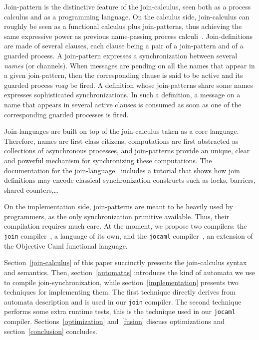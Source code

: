 Join-pattern is the distinctive feature of the join-calculus, seen
both as a process calculus and as a programming language.  On the
calculus side, join-calculus can roughly be seen as a functional
calculus plus join-patterns, thus achieving the same expressive power
as previous name-passing process calculi~\cite{Milner-pi-calculus}.
Join-definitions are made of several clauses, each clause being a pair
of a join-pattern and of a guarded process.  A join-pattern expresses
a synchronization between several {\em names} (or channels). When
messages are pending on all the names that appear in a given
join-pattern, then the corresponding clause is said to be active and
its guarded process {\em may} be fired.  A definition whose
join-patterns share some names expresses sophisticated
synchronizations. In such a definition, a message on a name that
appears in several active clauses is consumed as soon as one of the
corresponding guarded processes is fired.

Join-languages are built on top of the join-calculus taken as a core
language.  Therefore, names are first-class citizens, computations are
first abstracted as collections of asynchronous processes, and
join-patterns provide an unique, clear and powerful mechanism for
synchronizing these computations.  The documentation for the
join-language~\cite{Join} includes a tutorial that shows how join
definitions may encode classical synchronization constructs such as
locks, barriers, shared counters,\ldots

On the implementation side, join-patterns are meant to be heavily used
by programmers, as the only synchronization primitive available.
Thus, their compilation requires much care.  At the moment, we propose
two compilers: the {\tt join} compiler~\cite{Join}, a language of its
own, and the {\tt jocaml} compiler~\cite{Jocaml}, an extension of the
Objective Caml functional language.

Section~\ref{join-calculus} of this paper succinctly presents the
join-calculus syntax and semantics. Then, section~\ref{automatas}
introduces the kind of automata we use to compile
join-synchronization, while section~\ref{implementation} presents two
techniques for implementing them.  The first technique directly
derives from automata description and is used in our {\tt join}
compiler. The second technique performs some extra runtime tests, this
is the technique used in our {\tt jocaml} compiler.
Sections~\ref{optimization} and~\ref{fusion} discuss
optimizations and section~\ref{conclusion} concludes.




